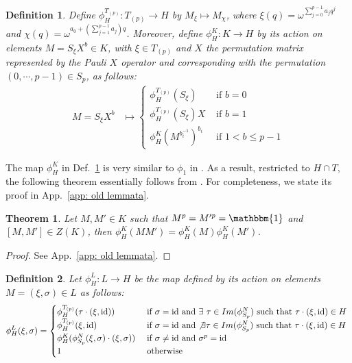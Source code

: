 \documentclass[aps,pra,letterpaper,onrcolumn,nofootinbib,notitlepage,longbibliography]{revtex4-1}
\newtheorem{theorem}{Theorem}
\newtheorem{definition}{Definition}
\newcommand{\mf}[1]{#1}
\newcommand{\one}{\mathbbm{1}}
\newcommand{\id}{\mathrm{id}}
\begin{document}
\begin{definition}\label{def: phi^K_H}
    Define $\phi^{T_{(p)}}_H:T_{(p)}\to H$ by $M_\xi\mapsto M_\chi$, \mf{where $\xi(q)=\omega^{\sum_{j=0}^{p-1} a_jq^j}$ and $\chi(q)=\omega^{a_0+(\sum_{j=1}^{p-1}a_j)q}$}. Moreover, define $\phi^K_H:K\to H$ by its action on elements $M=S_\xi X^b\in K$, with $\xi\in T_{(p)}$ and $X$ the permutation matrix represented by the Pauli $X$ operator and corresponding with the permutation $(0,\cdots,p-1)\in S_p$, as follows:
    \begin{align*}
        M=S_\xi X^b&\mapsto \left\lbrace
        \begin{array}{ll}
        \phi^{T_{(p)}}_H(S_\xi)      &   \text{ if $b=0$}\\
        \phi^{T_{(p)}}_H(S_\xi)X     &   \text{ if $b=1$}\\
        \phi^K_H(M^{b_i^{-1}})^{b_i}            &   \text{ if $1<b\leq p-1$}
        \end{array}
        \right.
        \end{align*}
\end{definition}

The map $\phi^K_H$ in Def.~\ref{def: phi^K_H} is very similar to $\phi_1$ in \cite[Def.~2]{FrembsChungOkay2022}. As a result, restricted to $H\cap T$,
the following theorem essentially follows from \cite[Thm.~1]{FrembsChungOkay2022}. For completeness, we state its proof in App.~\ref{app: old lemmata}.

\begin{theorem}{\label{thm:K to H}}
    Let $M,M'\in K$ such that $M^p=M'^p=\one$ and $[M,M']\in Z(K)$, then $\phi^K_H(MM')=\phi^K_H(M)\phi^K_H(M')$.
\end{theorem}

\begin{proof}
    See App.~\ref{app: old lemmata}.
\end{proof}

\begin{definition}\label{def: phi^L_H}
    Let $\phi^L_{H}:L\to H$ be the map defined by its action on elements $M=(\xi,\sigma)\in L$ as follows:
    \[
    \phi^L_H(\xi,\sigma)
    =\begin{cases}
        \phi^{T_{(p)}}_H(\tau\cdot (\xi,\id))  &  \text{ if $\sigma=\id$ and $\exists\  \tau\in Im(\phi^N_{S_p})$ such that $\tau\cdot(\xi,\id)\in H$} \\
        \mf{\phi^{T_{(p)}}_H(\xi,\id)} &  \text{ if $\sigma=\id$ and $\not\exists\tau \in Im(\phi^N_{S_p})$ such that $\tau\cdot(\xi,\id)\in H$ }\\
        \phi^K_H(\phi^N_{S_p}(\xi,\sigma)\cdot (\xi,\sigma) )&  \text{ if $\sigma\neq\id$ and $\sigma^p=\id$}\\
        1&  \text{ otherwise}
    \end{cases}
    \]
\end{definition}
\end{document}
